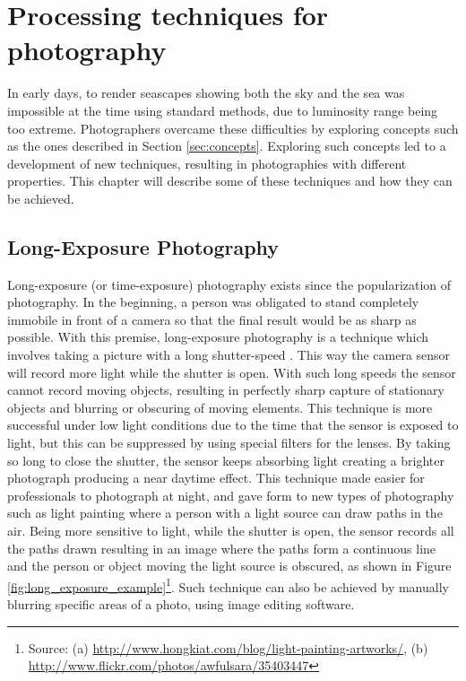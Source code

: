 \section{Processing techniques for photography}
\label{sub:photo_techniques}

In early days, to render seascapes showing both the sky and the sea was impossible at the time using standard methods, due to luminosity range being too extreme. Photographers overcame these difficulties by exploring concepts such as the ones described in Section \ref{sec:concepts}. Exploring such concepts led to a development of new techniques, resulting in photographies with different properties. This chapter will describe some of these techniques and how they can be achieved.



\subsection{Long-Exposure Photography}

Long-exposure (or time-exposure) photography exists since the popularization of photography. In the beginning, a person was obligated to stand completely immobile in front of a camera so that the final result would be as sharp as possible.
With this premise, long-exposure photography is a technique which involves taking a picture with a long shutter-speed \cite{Kamps2012}. This way the camera sensor will record more light while the shutter is open. With such long speeds the sensor cannot record moving objects, resulting in perfectly sharp capture of stationary objects and blurring or obscuring of moving elements.
This technique is more successful under low light conditions due to the time that the sensor is exposed to light, but this can be suppressed by using special filters for the lenses. By taking so long to close the shutter, the sensor keeps absorbing light creating a brighter photograph producing a near daytime effect.
This technique made easier for professionals to photograph at night, and gave form to new types of photography such as light painting where a person with a light source can draw paths in the air. Being more sensitive to light, while the shutter is open, the sensor records all the paths drawn resulting in an image where the paths form a continuous line and the person or object moving the light source is obscured, as shown in Figure \ref{fig:long_exposure_example}\footnote{Source: (a) \url{http://www.hongkiat.com/blog/light-painting-artworks/}, (b) \url{http://www.flickr.com/photos/awfulsara/35403447}}. Such technique can also be achieved by manually blurring specific areas of a photo, using image editing software.

